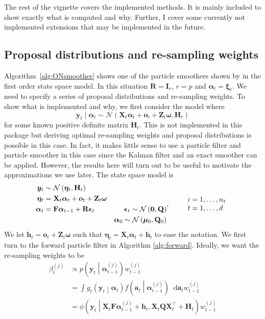 \documentclass[notitlepage]{article}
\renewcommand{\vec}[1]{\bm{#1}}
\newcommand{\mat}[1]{\mathbf{#1}}
\newcommand{\Lparen}[1]{\left( #1\right)}
\newcommand{\Cond}[2]{ #1 \middle\vert  #2}
\newcommand*\diff{\mathop{}\!\mathrm{d}}
\newcommand{\optor}[2]{#1\Lparen{#2}}
\newcommand{\optorC}[3]{\optor{#1}{\Cond{#2}{#3}}}
\newcommand{\pdensC}[2]{\optorC{p}{#1}{#2}}
\newcommand{\normal}[2]{\optor{\mathcal{N}}{#1,#2}}
\newcommand{\normaldC}[3]{\optorC{\phi}{#1}{#2,#3}}
\newcommand{\partic}[3]{#1_{#2}^{\Lparen{#3}}}
\newcommand{\dimState}{p}
\newcommand{\dimRng}{r}
\begin{document}
The rest of the vignette covers the implemented methods. It is mainly included to show exactly what is 
computed and why. Further, I cover some currently not implemented extensions that may be implemented in the 
future. 


\subsection{Proposal distributions and re-sampling weights}
Algorithm~\ref{alg:ONsmoother} shows one of the particle smoothers shown by
\cite{fearnhead10} in the first order state space model. In this situation $\mat R = \mat I_\dimRng$,
$\dimRng = \dimState$ and $\vec\alpha_t = \vec\xi_t$. We need to specify a series of proposal distributions and 
re-sampling weights. To show what is implemented and why, we first 
consider the model where %
%
$$\vec y_t \mid \vec\alpha_t \sim \normal{%
	\mat{X}_t\vec{\alpha}_t + \vec{o}_t +  \mat{Z}_t\vec{\omega}}{\mat H_t}$$%
%
for some known positive definite matrix $\mat H_t$. This is not implemented 
in this package but deriving 
optimal re-sampling weights and proposal distributions is possible in this case. 
In fact, it makes little sense to use a particle filter and particle smoother in this case
since the Kalman filter and an exact smoother can be applied. However, the results here
will turn out to be useful to motivate the approximations we use
later. The state space model is%
%
$$\begin{aligned}
 	\vec y_t & \sim \normal{\vec\eta_t}{\mat H_t} &  \\
%
 	\vec{\eta}_{t} &= \mat{X}_t\vec{\alpha}_t + \vec{o}_t +   
 	\mat{Z}_t\vec\omega & \\
%
 	\vec{\alpha}_t &= \mat{F}\vec{\alpha}_{t - 1} + \mat{R}\vec{\epsilon}_t&
 		\vec{\epsilon}_t \sim \normal{\vec{0}}{\mat{Q}} \\
%
	& \vphantom{a} &	\vec{\alpha}_0 \sim \normal{\vec\mu_0}{\mat{Q}_0}
\end{aligned}, \qquad
%
\begin{array}{l} i = 1, \dots, n_t \\ t = 1, \dots, d \end{array}$$%
%
We let $\vec h_t = \vec{o}_t + \mat{Z}_t\vec\omega$ such that 
$\vec \eta_t = \mat X_t\vec \alpha_t + \vec h_t$ to ease the notation.  
We first turn to the forward particle filter in Algorithm \ref{alg:forward}. Ideally, we 
want the re-sampling weights to be 
%
\begin{align}\label{eq:fwReWeight}
\partic\beta tj &\propto \pdensC{\vec y_t}{\partic{\vec\alpha}{t-1}j}\partic w{t-1}j \\
	&=\int \optorC{g_t}{\vec y_t}{\vec\alpha_t}
		\optorC{f}{\vec a_t}{\partic{\vec\alpha}{t-1}j}\diff\vec a_t \partic w{t-1}j \nonumber\\
	&= \normaldC{\vec y_t }{\mat X_t\mat F\partic{\vec\alpha}{t-1}j + \vec h_t}{%
	\mat X_t \mat Q \mat X_t^\top + \mat H_t}
	\partic w{t-1}j\nonumber
\end{align}%
\end{document}
